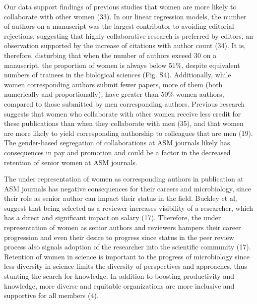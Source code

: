 \documentclass[11pt,]{article}
\begin{document}
Our data support findings of previous studies that women are more likely
to collaborate with other women (33). In our linear regression models,
the number of authors on a manuscript was the largest contributor to
avoiding editorial rejections, suggesting that highly collaborative
research is preferred by editors, an observation supported by the
increase of citations with author count (34). It is, therefore,
disturbing that when the number of authors exceed 30 on a manuscript,
the proportion of women is always below 51\%, despite equivalent numbers
of trainees in the biological sciences (Fig. S4). Additionally, while
women corresponding authors submit fewer papers, more of them (both
numerically and proportionally), have greater than 50\% women authors,
compared to those submitted by men corresponding authors. Previous
research suggests that women who collaborate with other women receive
less credit for these publications than when they collaborate with men
(35), and that women are more likely to yield corresponding authorship
to colleagues that are men (19). The gender-based segregation of
collaborations at ASM journals likely has consequences in pay and
promotion and could be a factor in the decreased retention of senior
women at ASM journals.

The under representation of women as corresponding authors in
publication at ASM journals has negative consequences for their careers
and microbiology, since their role as senior author can impact their
status in the field. Buckley et al, suggest that being selected as a
reviewer increases visibility of a researcher, which has a direct and
significant impact on salary (17). Therefore, the under representation
of women as senior authors and reviewers hampers their career
progression and even their desire to progress since status in the peer
review process also signals adoption of the researcher into the
scientific community (17). Retention of women in science is important to
the progress of microbiology since less diversity in science limits the
diversity of perspectives and approaches, thus stunting the search for
knowledge. In addition to boosting productivity and knowledge, more
diverse and equitable organizations are more inclusive and supportive
for all members (4).
\end{document}
